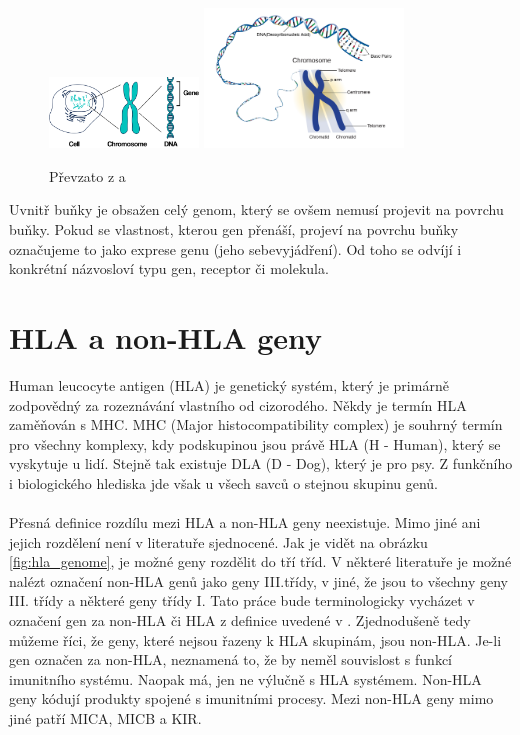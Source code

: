 \documentclass[czech,DP]{thesiskiv}
\numberwithin{equation}{section}
\begin{document}
\begin{figure}[H]		
		\centering
		\includegraphics[width=150px]{./img/lidska_bunka.png}
		\includegraphics[width=200px]{./img/chromosome.jpg}
		\caption{Převzato z \cite{human_cell} a \cite{chromosome_structure}}
		\label{fig:chrmosome}
\end{figure}

\noindent
Uvnitř buňky je obsažen celý genom, který se ovšem nemusí projevit na povrchu buňky. Pokud se vlastnost, kterou gen přenáší, projeví na povrchu buňky označujeme to jako exprese genu (jeho sebevyjádření). Od toho se odvíjí i konkrétní názvosloví typu gen, receptor či molekula.


\section{HLA a non-HLA geny}
Human leucocyte antigen (HLA) je genetický systém, který je primárně zodpovědný za rozeznávání vlastního od cizorodého. Někdy je termín HLA zaměňován s MHC. MHC (Major histocompatibility complex) je souhrný termín pro všechny komplexy, kdy podskupinou jsou právě HLA (H - Human), který se vyskytuje u lidí. Stejně tak existuje DLA (D - Dog), který je pro psy. Z funkčního i biologického hlediska jde však u všech savců o stejnou skupinu genů. \cite{KIR_transplantace_jindra}
\\
\\
Přesná definice rozdílu mezi HLA a non-HLA geny neexistuje. Mimo jiné ani jejich rozdělení není v literatuře sjednocené. Jak je vidět na obrázku \ref{fig:hla_genome}, je možné geny rozdělit do tří tříd. V některé literatuře je možné nalézt označení non-HLA genů jako geny III.třídy, v jiné, že jsou to všechny geny III. třídy a některé geny třídy I. Tato práce bude terminologicky vycházet v označení gen za non-HLA či HLA z definice uvedené v \cite{imgt_hla_database}. Zjednodušeně tedy můžeme říci, že geny, které nejsou řazeny k HLA skupinám, jsou non-HLA. Je-li gen označen za non-HLA, neznamená to, že by neměl souvislost s funkcí imunitního systému. Naopak má, jen ne výlučně s HLA systémem. Non-HLA geny kódují produkty spojené s imunitními procesy. Mezi non-HLA geny mimo jiné patří MICA, MICB a KIR. \cite{imgt_hla_database}
\end{document}
